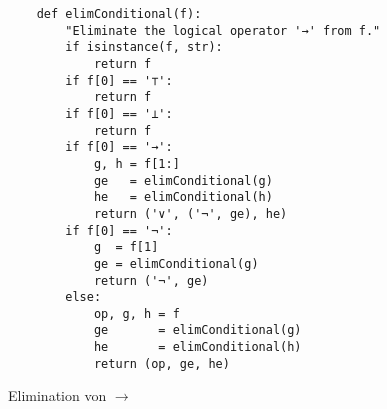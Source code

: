 \begin{figure}[!ht]
  \centering
\begin{verbatim}
    def elimConditional(f):
        "Eliminate the logical operator '→' from f."
        if isinstance(f, str): 
            return f
        if f[0] == '⊤':
            return f
        if f[0] == '⊥':
            return f
        if f[0] == '→':
            g, h = f[1:]
            ge   = elimConditional(g)
            he   = elimConditional(h)
            return ('∨', ('¬', ge), he)
        if f[0] == '¬':
            g  = f[1]
            ge = elimConditional(g)
            return ('¬', ge)
        else:
            op, g, h = f
            ge       = elimConditional(g)
            he       = elimConditional(h)
            return (op, ge, he)
\end{verbatim}
\vspace*{-0.3cm}
  \caption{Elimination von $\rightarrow$}
  \label{fig:eliminate-folgt}
\end{figure}
 
